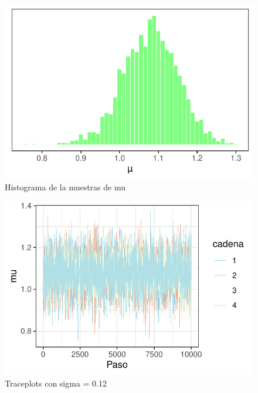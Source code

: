 \documentclass[
]{article}
\begin{document}
\begin{figure}

{\centering \includegraphics{TP-2---El-Dibu-de-la-vida_files/figure-latex/f12-1} 

}

\caption{Histograma de la muestras de mu}\label{fig:f12}
\end{figure}

\begin{figure}

{\centering \includegraphics{TP-2---El-Dibu-de-la-vida_files/figure-latex/f13-1} 

}

\caption{Traceplots con sigma = 0.12}\label{fig:f13}
\end{figure}
\end{document}
